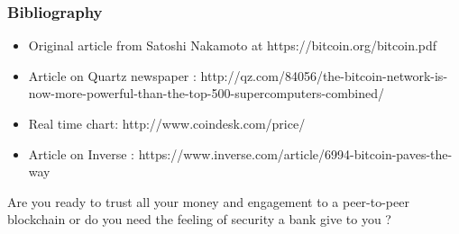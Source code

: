 \documentclass[12pt]{beamer}
\begin{document}
\begin{frame}
\frametitle{Bibliography}
\begin{itemize}
\item Original article from Satoshi Nakamoto at https://bitcoin.org/bitcoin.pdf
\item Article on Quartz newspaper : http://qz.com/84056/the-bitcoin-network-is-now-more-powerful-than-the-top-500-supercomputers-combined/
\item Real time chart: http://www.coindesk.com/price/
\item Article on Inverse : https://www.inverse.com/article/6994-bitcoin-paves-the-way
\end{itemize}

\end{frame}

\begin{frame}

Are you ready to trust all your money and engagement to a peer-to-peer blockchain or do you need the feeling of security a bank give to you ?


\end{frame}
\end{document}
